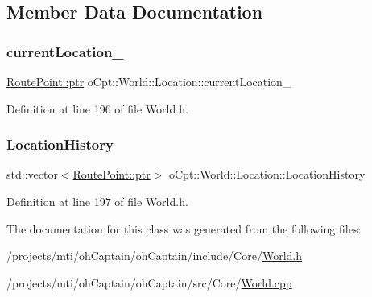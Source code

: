 \subsection{Member Data Documentation}
\hypertarget{classo_cpt_1_1_world_1_1_location_ad8835274ec8b5ea13b1c01a477bafff9}{}\label{classo_cpt_1_1_world_1_1_location_ad8835274ec8b5ea13b1c01a477bafff9} 
\subsubsection{\texorpdfstring{current\+Location\+\_\+}{currentLocation\_}}
{\footnotesize\ttfamily \hyperlink{structo_cpt_1_1_world_1_1_location_1_1_route_point_aa042feea77cb3c1531ab4e8ecf42fbd6}{Route\+Point\+::ptr} o\+Cpt\+::\+World\+::\+Location\+::current\+Location\+\_\+\hspace{0.3cm}{\ttfamily [private]}}



Definition at line 196 of file World.\+h.

\hypertarget{classo_cpt_1_1_world_1_1_location_a11e2d55bfa797b41b98e032f50911021}{}\label{classo_cpt_1_1_world_1_1_location_a11e2d55bfa797b41b98e032f50911021} 
\subsubsection{\texorpdfstring{Location\+History}{LocationHistory}}
{\footnotesize\ttfamily std\+::vector$<$\hyperlink{structo_cpt_1_1_world_1_1_location_1_1_route_point_aa042feea77cb3c1531ab4e8ecf42fbd6}{Route\+Point\+::ptr}$>$ o\+Cpt\+::\+World\+::\+Location\+::\+Location\+History\hspace{0.3cm}{\ttfamily [private]}}



Definition at line 197 of file World.\+h.



The documentation for this class was generated from the following files\+:\begin{DoxyCompactItemize}
\item 
/projects/mti/oh\+Captain/oh\+Captain/include/\+Core/\hyperlink{_world_8h}{World.\+h}\item 
/projects/mti/oh\+Captain/oh\+Captain/src/\+Core/\hyperlink{_world_8cpp}{World.\+cpp}\end{DoxyCompactItemize}
